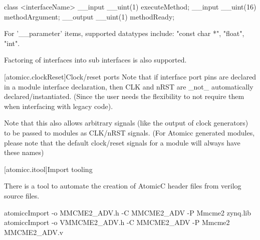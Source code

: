 \begin{bnf}
 \br
     \br
     \br
     \br
\end{bnf}

\begin{example}
\begin{codeblock}
     class <interfaceName> {
          __input __uint(1) executeMethod;
          __input __uint(16) methodArgument;
          __output __uint(1) methodReady;
     }
\end{codeblock}
\end{example}

For '__parameter' items, supported datatypes include: "const char *", "float", "int".

Factoring of interfaces into sub interfaces is also supported.

[atomicc.clockReset]{Clock/reset ports}
Note that if interface port pins are declared in a module interface declaration, then
CLK and nRST are _not_ automatically declared/instantiated.  (Since the user needs the
flexibility to not require them when interfacing with legacy code).

Note that this also allows arbitrary signals (like the output of clock generators) to be
passed to modules as CLK/nRST signals.  (For Atomicc generated modules, please note that the
default clock/reset signals for a module will always have these names)

[atomicc.itool]{Import tooling}

There is a tool to automate the creation of AtomicC header files from verilog source files.
\begin{example}
\begin{codeblock}
     atomiccImport -o MMCME2_ADV.h -C MMCME2_ADV -P Mmcme2 zynq.lib
     atomiccImport -o VMMCME2_ADV.h -C MMCME2_ADV -P Mmcme2 MMCME2_ADV.v
\end{codeblock}
\end{example}
